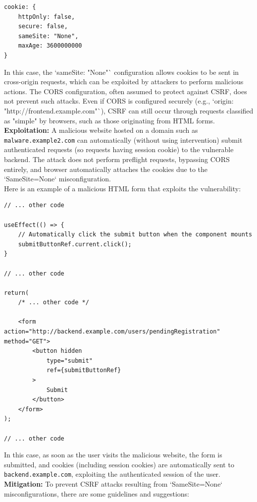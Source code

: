 \documentclass[]{article}
\begin{document}
\begin{lstlisting}
cookie: {
    httpOnly: false,
    secure: false,
    sameSite: "None",
    maxAge: 3600000000
}
\end{lstlisting}
In this case, the `sameSite: "None"` configuration allows cookies to be sent in cross-origin requests, which can be exploited by attackers to perform malicious actions. The CORS configuration, often assumed to protect against CSRF, does not prevent such attacks. Even if CORS is configured securely (e.g., `origin: "http://frontend.example.com"`), CSRF can still occur through requests classified as "simple" by browsers, such as those originating from HTML forms. \\ 
\textbf{Exploitation:}
A malicious website hosted on a domain such as \texttt{malware.example2.com} can automatically (without using intervention) submit authenticated requests (so requests having session cookie) to the vulnerable backend. The attack does not perform preflight requests, bypassing CORS entirely, and browser automatically attaches the cookies due to the `SameSite=None` misconfiguration. \\ 
Here is an example of a malicious HTML form that exploits the vulnerability:

\begin{lstlisting}
// ... other code

useEffect(() => {
    // Automatically click the submit button when the component mounts
    submitButtonRef.current.click();
}

// ... other code

return(
    /* ... other code */

    <form action="http://backend.example.com/users/pendingRegistration" method="GET">
        <button hidden
            type="submit" 
            ref={submitButtonRef}
        >
            Submit
        </button>
    </form>
);

// ... other code
\end{lstlisting}
In this case, as soon as the user visits the malicious website, the form is submitted, and cookies (including session cookies) are automatically sent to \texttt{backend.example.com}, exploiting the authenticated session of the user. \\ 
\textbf{Mitigation:}  
To prevent CSRF attacks resulting from `SameSite=None` misconfigurations, there are some guidelines and suggestions:
\end{document}
